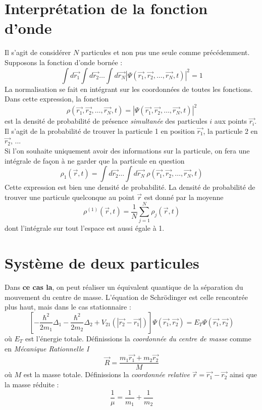 \documentclass[british,french,11pt, a4paper, openany]{book}
\begin{document}
\section{Interprétation de la fonction d'onde}
Il s'agit de considérer $N$ particules et non pus une seule comme précédemment. Supposons la fonction d'onde bornée :
\begin{equation}
	\int d\vec{r_1}\int d\vec{r_2}\dots\int d\vec{r_N}|\Psi(\vec{r_1}, \vec{r_2}, \dots, \vec{r_N}, t)|^2 = 1
\end{equation}
La normalisation se fait en intégrant sur les coordonnées de toutes les fonctions. Dans cette expression, la fonction 
\begin{equation}
	\rho(\vec{r_1}, \vec{r_2}, \dots, \vec{r_N}, t)=|\Psi(\vec{r_1}, \vec{r_2}, \dots, \vec{r_N}, t)|^2
\end{equation}
est la densité de probabilité de présence \textit{simultanée} des particules $i$ aux points $\vec{r_i}$. Il s'agit de la probabilité de trouver la particule 1 en position $\vec{r_1}$, la particule 2 en $\vec{r_2}$, ...\\
Si l'on souhaite uniquement avoir des informations sur la particule, on fera une intégrale de façon à ne garder que la particule en question
\begin{equation}
	\rho_1(\vec{r},t) = \int d\vec{r_2}\dots\int d\vec{r_N}\ \rho(\vec{r_1}, \vec{r_2}, \dots, \vec{r_N}, t)
\end{equation}
Cette expression est bien une densité de probabilité. La densité de probabilité de trouver une particule quelconque au point $\vec{r}$ est donné par la moyenne
\begin{equation}
	\rho^{(1)}(\vec{r},t) = \frac{1}{N}\sum_{j=1}^N \rho_j(\vec{r},t)
\end{equation}
dont l'intégrale sur tout l'espace est aussi égale à 1.

\section{Système de deux particules}
Dans \textbf{ce cas la}, on peut réaliser un équivalent quantique de la séparation du mouvement du centre de masse. L'équation de Schrödinger est celle rencontrée plus haut, mais dans le cas stationnaire :
\begin{equation}
	\left[-\frac{\hbar^2}{2m_1}\Delta_1 - \frac{\hbar^2}{2m_2}\Delta_2 + V_{21}(|\vec{r_2}-\vec{r_1}|) \right]\Psi(\vec{r_1}, \vec{r_2}) = E_T \Psi(\vec{r_1}, \vec{r_2})
\end{equation}
où $E_T$ est l'énergie totale. Définissions la \textit{coordonnée du centre de masse} comme en \textit{Mécanique Rationnelle I}
\begin{equation}
	\vec{R} = \frac{m_1\vec{r_1}+m_2\vec{r_2}}{M}
\end{equation}
où $M$ est la masse totale. Définissions la \textit{coordonnée relative} $\vec{r} = \vec{r_1}-\vec{r_2}$ ainsi que la masse réduite :
\begin{equation}
	\frac{1}{\mu} = \frac{1}{m_1}+\frac{1}{m_2}
\end{equation}
\end{document}
